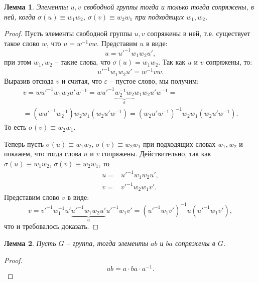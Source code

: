 \documentclass{article}
\newtheorem{lemma}{Лемма}[section]
\begin{document}
\begin{lemma}
    Элементы $u, v$ свободной группы тогда и только тогда сопряжены, в ней, когда $\sigma(u) \equiv w_1 w_2$, $\sigma(v) \equiv w_2 w_1$ при подходящих $w_1, w_2$.
\end{lemma}
\begin{proof}
    Пусть элементы свободной группы $u, v$ сопряжены в ней, т.е. существует такое слово $w$, что $u = w^{-1} v w$. Представим $u$ в виде: $$u = u'^{-1} w_1 w_2 u',$$ при этом $w_1, w_2$ -- такие слова, что $\sigma(u) = w_1 w_2$.
    Так как $u$ и $v$ сопряжены, то:
    \[
        u'^{-1} w_1 w_2 u' = w^{-1} v w.
    \]
    Выразив отсюда $v$ и считая, что $\varepsilon$ -- пустое слово, мы получим:
    \begin{multline*}
        v = w u'^{-1} w_1 w_2 u' w^{-1} = w u'^{-1} \underbrace{w_2^{-1} w_2}_{\varepsilon} w_1 w_2  u' w^{-1} = \\
        = (w u'^{-1} w_2^{-1}) w_2 w_1 (w_2 u' w^{-1}) = (w_2 u' w^{-1})^{-1} w_2 w_1 (w_2 u' w^{-1}).
    \end{multline*}
    То есть $\sigma(v) \equiv w_2 w_1$.

    Теперь пусть $\sigma(u) \equiv w_1 w_2$, $\sigma(v) \equiv w_2 w_1$ при подходящих словах $w_1, w_2$ и покажем, что тогда слова $u$ и $v$ сопряжены. Действительно, так как $\sigma(u) \equiv w_1 w_2$, $\sigma(v) \equiv w_2 w_1$, то
    \begin{align*}
        u =& u'^{-1} w_1 w_2 u', \\
        v =& v'^{-1} w_2 w_1 v'.
    \end{align*}
     Представим слово $v$ в виде: $$ v = v'^{-1} w_1^{-1} u' \underbrace{u'^{-1} w_1 w_2 u'}_{u} u'^{-1} w_1 v' = (u'^{-1} w_1 v')^{-1} u (u'^{-1} w_1 v'), $$
    что и требовалось доказать.
\end{proof}

\begin{lemma} \label{fasdjoi}
    Пусть $G$ -- группа, тогда элементы $ab$ и $ba$ сопряжены в $G$.
\end{lemma}
\begin{proof}
    $$ ab = a \cdot ba \cdot a^{-1}. $$
\end{proof}
\end{document}
